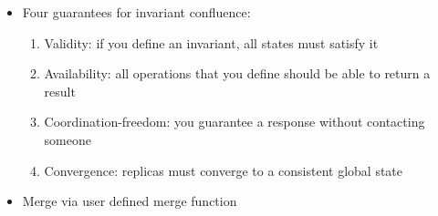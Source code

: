 \documentclass[10pt]{article}
\begin{document}
\begin{itemize}
\begin{itemize}
\end{itemize}
\item Four guarantees for invariant confluence:
\begin{enumerate}
\item Validity: if you define an invariant, all states must satisfy it
\item Availability: all operations that you define should be able to return a result
\item Coordination-freedom: you guarantee a response without contacting someone
\item Convergence: replicas must converge to a consistent global state
\end{enumerate}
\item Merge via user defined merge function
\end{itemize}
\end{document}
